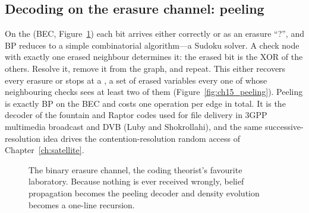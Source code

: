 \subsection{Decoding on the erasure channel: peeling}

On the  (BEC, Figure~\ref{fig:ch15_bec}) each bit arrives either correctly or as an erasure ``?'',
and BP reduces to a simple combinatorial algorithm---a Sudoku solver. A check node with exactly one
erased neighbour determines it: the erased bit is the XOR of the others. Resolve it, remove it from
the graph, and repeat. This  either recovers every erasure or stops at a
, a set of erased variables every one of whose neighbouring checks sees at least
two of them (Figure~\ref{fig:ch15_peeling}). Peeling is exactly BP on the BEC and costs one operation
per edge in total. It is the decoder of the fountain and Raptor codes used for file delivery in 3GPP
multimedia broadcast and DVB (Luby and Shokrollahi), and the same successive-resolution idea drives
the contention-resolution random access of Chapter~\ref{ch:satellite}.

\begin{figure}[H]\centering
{}
\caption{The binary erasure channel, the coding theorist's favourite laboratory. Because nothing is
ever received wrongly, belief propagation becomes the peeling decoder and density evolution
becomes a one-line recursion.}\label{fig:ch15_bec}\end{figure}


